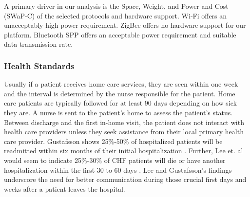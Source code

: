 A primary driver in our analysis is the Space, Weight, and Power and Cost (SWaP-C) of the selected protocols and hardware support. Wi-Fi offers an unacceptably high power requirement. ZigBee offers no hardware support for our platform. Bluetooth SPP offers an acceptable power requirement and suitable data transmission rate.

\subsubsection{Health Standards}
\label{subsubsec:HealthStandards}
Usually if a patient receives home care services, they are seen within one week and the interval is determined by the nurse responsible for the patient. Home care patients are typically followed for at least 90 days depending on how sick they are. A nurse is sent to the patient's home to assess the patient's status. Between discharge and the first in-home visit, the patient does not interact with health care providers unless they seek assistance from their local primary health care provider. Gustafsson shows 25\%-50\% of hospitalized patients will be readmitted within six months of their initial hospitalization \cite{Gustafsson2004}. Further, Lee et. al would seem to indicate 25\%-30\% of CHF patients will die or have another hospitalization within the first 30 to 60 days \cite{Lee2011}. Lee and Gustafsson's findings underscore the need for better communication during those crucial first days and weeks after a patient leaves the hospital.


